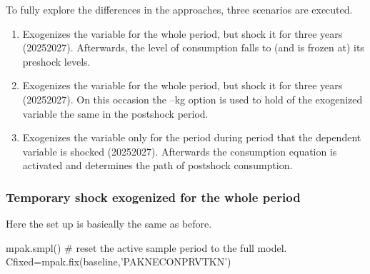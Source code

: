 \documentclass[letterpaper,10pt,english]{jupyterBook}
\begin{document}
\sphinxAtStartPar
To fully explore the differences in the approaches, three scenarios are executed.
\begin{enumerate}
%
\item {} 
\sphinxAtStartPar
Exogenizes the variable for the whole period, but shock it for three years (2025\sphinxhyphen{}2027). Afterwards, the level of consumption falls to (and is frozen at) its pre\sphinxhyphen{}shock levels.

\item {} 
\sphinxAtStartPar
Exogenizes the variable for the whole period, but shock it for three years (2025\sphinxhyphen{}2027). On this occasion the –kg option is used to hold  of the exogenized variable the same in the post\sphinxhyphen{}shock period.

\item {} 
\sphinxAtStartPar
Exogenizes the variable only for the period during period that the dependent variable is shocked (2025\sphinxhyphen{}2027). Afterwards the consumption equation is activated and determines the path of post\sphinxhyphen{}shock consumption.

\end{enumerate}


\subsubsection{Temporary shock exogenized for the whole period}
\label{\detokenize{content/06_WBModels/LoadingWBModel:temporary-shock-exogenized-for-the-whole-period}}
\sphinxAtStartPar
Here the set up is basically the same as before.

\sphinxAtStartPar
mpak.smpl() \# reset the active sample period to the full model.
Cfixed=mpak.fix(baseline,’PAKNECONPRVTKN’)
\end{document}
